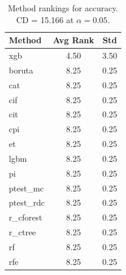 \begin{table}[h]
\centering
\caption{Method rankings for accuracy. CD = 15.166 at $\alpha=0.05$.}
\label{tab:ranks_accuracy}
\begin{tabular}{lcc}
\toprule
Method & Avg Rank & Std \\
\midrule
xgb & 4.50 & 3.50 \\
boruta & 8.25 & 0.25 \\
cat & 8.25 & 0.25 \\
cif & 8.25 & 0.25 \\
cit & 8.25 & 0.25 \\
cpi & 8.25 & 0.25 \\
et & 8.25 & 0.25 \\
lgbm & 8.25 & 0.25 \\
pi & 8.25 & 0.25 \\
ptest_mc & 8.25 & 0.25 \\
ptest_rdc & 8.25 & 0.25 \\
r_cforest & 8.25 & 0.25 \\
r_ctree & 8.25 & 0.25 \\
rf & 8.25 & 0.25 \\
rfe & 8.25 & 0.25 \\
\bottomrule
\end{tabular}
\end{table}